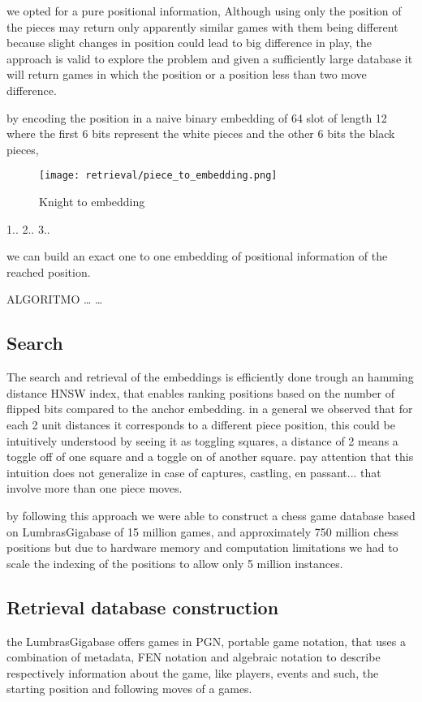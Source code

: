we opted for a pure positional information, Although using only the position of the pieces may return only apparently similar games with them being different because 
slight changes in position could lead to big difference in play, the approach is valid to explore the problem and given a sufficiently large database it will return 
games in which the position or a position less than two move difference.

by encoding the position in a naive binary embedding of 64 slot of length 12 where the first 6 bits represent the white pieces and the other 6 bits the black pieces, 

\begin{figure}[ht]
\centering
\texttt{[image: retrieval/piece\_to\_embedding.png]}
\caption{Knight to embedding}
\label{fig:retrieval:piecetoembedding}
\end{figure}

1..
2..
3..


we can build an exact one to one embedding of positional information of the reached position.

ALGORITMO
\dots
\dots

\subsection{Search}
The search and retrieval of the embeddings is efficiently done trough an hamming distance HNSW index, that enables 
ranking positions based on the number of flipped bits compared to the anchor embedding.
in a general we observed that for each 2 unit distances it corresponds to a different piece position, this could be intuitively understood 
by seeing it as toggling squares, a distance of 2 means a toggle off of one square 
and a toggle on of another square.
pay attention that this intuition does not generalize in case of captures, castling, en passant... that involve more than one piece moves.

by following this approach we were able to construct a chess game database based on LumbrasGigabase \cite{retrieval:lumbrasgigabase} of 15 million games, 
and approximately 750 million chess positions but due to hardware memory and computation limitations we had to scale the indexing of the positions to allow only 5 million instances.

\subsection{Retrieval database construction}
the LumbrasGigabase offers games in PGN, portable game notation, that uses a combination of metadata, FEN notation and algebraic notation to describe 
respectively information about the game, like players, events and such, the starting position and following moves of a games.

